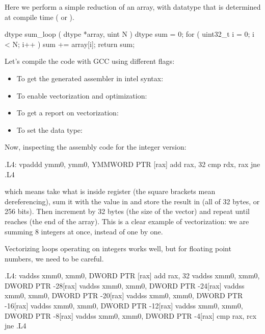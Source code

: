 \begin{exampleblock}
Here we perform a simple reduction of an array, with datatype  that is determined at compile time ( or ).
\begin{codeblock}[language=C]
    dtype sum_loop ( dtype *array, uint N ) 
    {
        dtype sum = 0;
        for ( uint32_t i = 0; i < N; i++ ) {
            sum += array[i];
        }
        return sum;
    }
\end{codeblock}
Let's compile the code with GCC using different flags:
\begin{itemize}
    \item To get the generated assembler in intel syntax:
    
    \item To enable vectorization and optimization:
    
    \item To get a report on vectorization:
    

    \item To set the data type:
    
\end{itemize}

Now, inspecting the assembly code for the integer version:
\begin{codeblock}[language={[x86masm]Assembler}, morekeywords={vpaddd}, basicstyle=\ttfamily\scriptsize]
.L4:
    vpaddd  ymm0, ymm0, YMMWORD PTR [rax]
    add    rax, 32
    cmp   rdx, rax 
    jne   .L4
\end{codeblock}
which means take what is inside register  (the square brackets mean dereferencing), sum it with the value in  and store the result in  (all of 32 bytes, or 256 bits). Then increment  by 32 bytes (the size of the vector) and repeat until  reaches  (the end of the array). This is a clear example of vectorization: we are summing 8 integers at once, instead of one by one.

Vectorizing loops operating on integers works well, but for floating point numbers, we need to be careful.

\begin{codeblock}[language={[x86masm]Assembler}, morekeywords={vaddss}, basicstyle=\ttfamily\scriptsize]
.L4:
    vaddss  xmm0, xmm0, DWORD PTR [rax]
    add     rax, 32
    vaddss  xmm0, xmm0, DWORD PTR -28[rax]
    vaddss  xmm0, xmm0, DWORD PTR -24[rax]
    vaddss  xmm0, xmm0, DWORD PTR -20[rax]
    vaddss  xmm0, xmm0, DWORD PTR -16[rax]
    vaddss  xmm0, xmm0, DWORD PTR -12[rax]
    vaddss  xmm0, xmm0, DWORD PTR -8[rax]
    vaddss  xmm0, xmm0, DWORD PTR -4[rax]
    cmp     rax, rcx
    jne     .L4
\end{codeblock}


\end{exampleblock}
